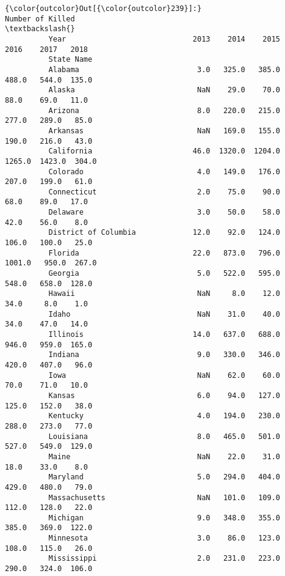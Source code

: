 \documentclass[11pt]{article}
\begin{document}
\begin{Verbatim}[commandchars=\\\{\}]
{\color{outcolor}Out[{\color{outcolor}239}]:}                      Number of Killed                                         \textbackslash{}
          Year                             2013    2014    2015    2016    2017   2018   
          State Name                                                                     
          Alabama                           3.0   325.0   385.0   488.0   544.0  135.0   
          Alaska                            NaN    29.0    70.0    88.0    69.0   11.0   
          Arizona                           8.0   220.0   215.0   277.0   289.0   85.0   
          Arkansas                          NaN   169.0   155.0   190.0   216.0   43.0   
          California                       46.0  1320.0  1204.0  1265.0  1423.0  304.0   
          Colorado                          4.0   149.0   176.0   207.0   199.0   61.0   
          Connecticut                       2.0    75.0    90.0    68.0    89.0   17.0   
          Delaware                          3.0    50.0    58.0    42.0    56.0    8.0   
          District of Columbia             12.0    92.0   124.0   106.0   100.0   25.0   
          Florida                          22.0   873.0   796.0  1001.0   950.0  267.0   
          Georgia                           5.0   522.0   595.0   548.0   658.0  128.0   
          Hawaii                            NaN     8.0    12.0    34.0     8.0    1.0   
          Idaho                             NaN    31.0    40.0    34.0    47.0   14.0   
          Illinois                         14.0   637.0   688.0   946.0   959.0  165.0   
          Indiana                           9.0   330.0   346.0   420.0   407.0   96.0   
          Iowa                              NaN    62.0    60.0    70.0    71.0   10.0   
          Kansas                            6.0    94.0   127.0   125.0   152.0   38.0   
          Kentucky                          4.0   194.0   230.0   288.0   273.0   77.0   
          Louisiana                         8.0   465.0   501.0   527.0   549.0  129.0   
          Maine                             NaN    22.0    31.0    18.0    33.0    8.0   
          Maryland                          5.0   294.0   404.0   429.0   480.0   79.0   
          Massachusetts                     NaN   101.0   109.0   112.0   128.0   22.0   
          Michigan                          9.0   348.0   355.0   385.0   369.0  122.0   
          Minnesota                         3.0    86.0   123.0   108.0   115.0   26.0   
          Mississippi                       2.0   231.0   223.0   290.0   324.0  106.0   

\end{Verbatim}
\end{document}
